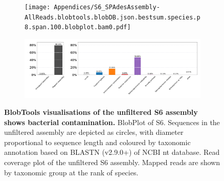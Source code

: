 \label{apx:BlobToolsAnalysis}
\begin{figure}[h!]
    \centering
    \begin{subfigure}[]{0.78\textwidth}
        \centering
        \texttt{[image: Appendices/S6\_SPAdesAssembly-AllReads.blobtools.blobDB.json.bestsum.species.p8.span.100.blobplot.bam0.pdf]}
        \caption{}
        \label{fig:BlobPlot-S6-All}
    \end{subfigure}
    \begin{subfigure}[]{0.9\textwidth}
        \centering
        \includegraphics[width=\textwidth]{Appendices/S6_SPAdesAssembly-AllReads.blobtools.blobDB.json.bestsum.species.p8.span.100.blobplot.read_cov.bam0.pdf}
        \caption{}
        \label{fig:BlobPlot_readcov-S6-All}
    \end{subfigure}
    \caption[BlobTools visualisations of the unfiltered S6 assembly]{\textbf{BlobTools visualisations of the unfiltered S6 assembly shows bacterial contamination.}
         BlobPlot of S6. Sequences in the unfiltered assembly are depicted as circles, with diameter proportional to sequence length and coloured by taxonomic annotation based on BLASTN (v2.9.0+) of NCBI nt database.
         Read coverage plot of the unfiltered S6 assembly. Mapped reads are shown by taxonomic group at the rank of species.}
        \label{fig:S6:BlobToolsAllreads}
\end{figure}

